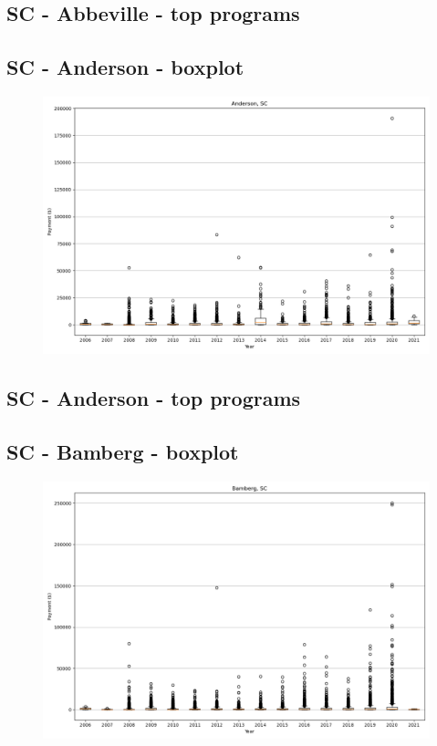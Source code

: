 \subsection*{SC - Abbeville - top programs}

\newpage
\subsection*{SC - Anderson - boxplot}
\begin{figure}[h]
\centering
\includegraphics[width=7in]{../output/boxplots/counties/Anderson-SC_boxplot.png}
\end{figure}


\subsection*{SC - Anderson - top programs}

\newpage
\subsection*{SC - Bamberg - boxplot}
\begin{figure}[h]
\centering
\includegraphics[width=7in]{../output/boxplots/counties/Bamberg-SC_boxplot.png}
\end{figure}


